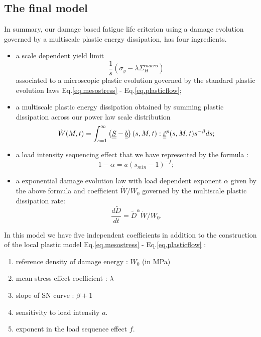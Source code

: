 \subsection{The final model}
\label{sec:5.6.3}
In summary, our damage based fatigue life criterion using a damage evolution governed by a multiscale plastic energy dissipation, has four ingredients.
\begin{itemize}
\item  a scale dependent yield limit $$\frac{1}{s} (\sigma_y- \lambda \Sigma_H^{macro})$$ associated to a microscopic plastic evolution governed by the standard plastic evolution laws Eq.\eqref{eq.mesostress} - Eq.\eqref{eq.plasticflow};

\vspace{6pt}	

\item a multiscale plastic energy dissipation obtained by summing plastic dissipation across our power law scale distribution
\begin{equation}
\dot{W}(M,t)=\int_{s=1}^{\infty}\left(\uline{\uline{S}}-\uline{\uline{b}} \right) (s,M,t):\uline{\uline{\dot{\varepsilon}}}^p(s,M,t) s^{-\beta}ds;
\label{eq.final2}
\end{equation}

\vspace{6pt}	

\item a load intensity sequencing effect that we have represented by the formula : 
\begin{equation}
1 - \alpha = a (s_{min}-1)^{-f};
\label{eq.final3}
\end{equation}

\vspace{6pt}	

\item a exponential damage evolution law with load dependent exponent $\alpha$ given by the above formula and coefficient $\dot{W}/W_0$ governed by the multiscale plastic dissipation rate: 
\begin{equation}
\dfrac{d\tilde{D}}{dt} ={\tilde{D}}^\alpha \dot{W}/W_0.
\label{eq.final4}
\end{equation}
\end{itemize}

In this model we have five independent coefficients in addition to the construction of the local plastic model Eq.\eqref{eq.mesostress} - Eq.\eqref{eq.plasticflow} :

\begin{enumerate}
\item reference density of damage energy : $W_0$ (in MPa)

\item mean stress effect coefficient : $\lambda$
\item slope of SN curve : $\beta+1$

\item sensitivity to load intensity $a$. 
\item exponent in the load sequence effect $f$. 
\end{enumerate}

